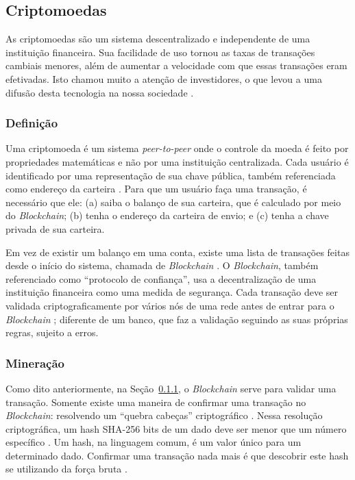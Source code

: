 \documentclass[
article,			%
12pt,				%
openright,			%
oneside,			%
a4paper,			%
chapter=TITLE,		%
section=TITLE,		%
subsection=TITLE,	%
subsubsection=TITLE,%
subsubsubsection=TITLE, %
english,			%
brazil,				%
]{abntex2}
\begin{document}

\subsection{Criptomoedas}

As criptomoedas são um sistema descentralizado e independente de uma
instituição financeira. Sua facilidade de uso tornou as taxas de
transações cambiais menores, além de aumentar a velocidade com que
essas transações eram efetivadas. Isto chamou muito a atenção de
investidores, o que levou a uma difusão desta tecnologia na nossa
sociedade \cite{Nakamoto2008, Prado2017}.

\subsubsection{Definição}\label{cap:definicao}

Uma criptomoeda é um sistema \emph{peer-to-peer} onde o controle da
moeda é feito por propriedades matemáticas e não por uma instituição
centralizada. Cada usuário é identificado por uma representação de sua
chave pública, também referenciada como endereço da carteira
\cite{Weber2012}. Para que um usuário faça uma transação, é necessário
que ele: (a) saiba o balanço de sua carteira, que é calculado por meio
do \emph{Blockchain}; (b) tenha o endereço da carteira de envio; e (c)
tenha a chave privada de sua carteira.

Em vez de existir um balanço em uma conta, existe uma lista de
transações feitas desde o início do sistema, chamada de
\emph{Blockchain} \cite{Weber2012}. O
\emph{Blockchain}, também referenciado como ``protocolo de
confiança'', usa a decentralização de uma instituição financeira como
uma medida de segurança. Cada transação deve ser validada
criptograficamente por vários nós de uma rede antes de entrar para o
\emph{Blockchain} \cite{LChicarino}; diferente de um banco, que faz a
validação seguindo as suas próprias regras, sujeito a erros.

\subsubsection{Mineração}

Como dito anteriormente, na Seção~\ref{cap:definicao}, o
\emph{Blockchain} serve para validar uma transação. Somente existe uma
maneira de confirmar uma transação no \emph{Blockchain}: resolvendo um
``quebra cabeças'' criptográfico \cite{Weber2012}. Nessa resolução
criptográfica, um hash SHA-256 bits de um dado deve ser menor que um
número específico \cite{Dev2014}. Um hash, na linguagem comum, é um
valor único para um determinado dado.  Confirmar uma transação nada
mais é que descobrir este hash se utilizando da força bruta
\cite{Arsov}.
\end{document}
